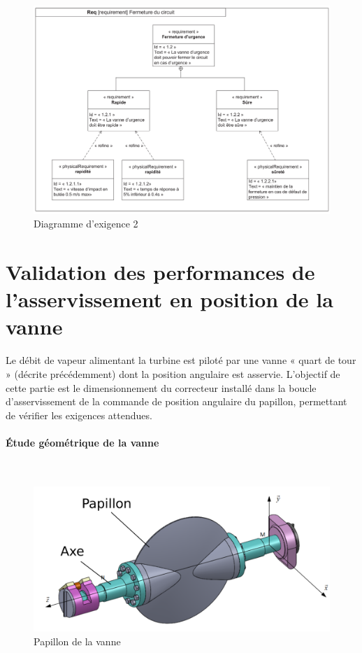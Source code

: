 \begin{figure}[ht!]
\begin{center}
 \includegraphics[width=0.55\linewidth]{img/fig07}
\end{center}
\caption{Diagramme d'exigence 2}
\label{fig07}
\end{figure}

\section{Validation des performances de l'asservissement en position de la vanne}

Le débit de vapeur alimentant la turbine est piloté par une vanne « quart de tour » (décrite précédemment) dont la position angulaire est asservie. L'objectif de cette partie est le dimensionnement du correcteur installé dans la boucle d'asservissement de la commande de position angulaire du papillon, permettant de vérifier les exigences attendues.


\paragraph{Étude géométrique de la vanne} ~\

\begin{figure}[ht!]
\begin{center}
 \includegraphics[width=0.7\linewidth]{img/fig08}
\end{center}
\caption{Papillon de la vanne}
\label{fig08}
\end{figure}

